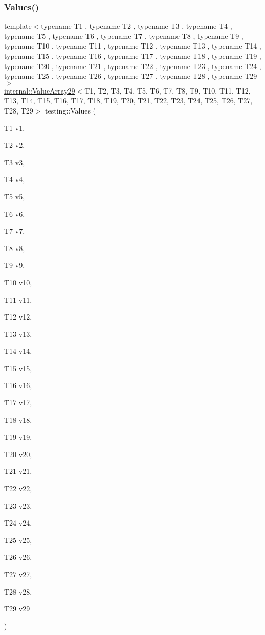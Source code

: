 \mbox{\label{namespacetesting_a3d8a9bd3f027d89ff2873e3f0ff396cb}} 
\subsubsection{\texorpdfstring{Values()}{Values()}\hspace{0.1cm}{\footnotesize\ttfamily [30/51]}}
{\footnotesize\ttfamily template$<$typename T1 , typename T2 , typename T3 , typename T4 , typename T5 , typename T6 , typename T7 , typename T8 , typename T9 , typename T10 , typename T11 , typename T12 , typename T13 , typename T14 , typename T15 , typename T16 , typename T17 , typename T18 , typename T19 , typename T20 , typename T21 , typename T22 , typename T23 , typename T24 , typename T25 , typename T26 , typename T27 , typename T28 , typename T29 $>$ \\
\mbox{\hyperlink{classtesting_1_1internal_1_1_value_array29}{internal\+::\+Value\+Array29}}$<$T1, T2, T3, T4, T5, T6, T7, T8, T9, T10, T11, T12, T13, T14, T15, T16, T17, T18, T19, T20, T21, T22, T23, T24, T25, T26, T27, T28, T29$>$ testing\+::\+Values (\begin{DoxyParamCaption}\item[{T1}]{v1,  }\item[{T2}]{v2,  }\item[{T3}]{v3,  }\item[{T4}]{v4,  }\item[{T5}]{v5,  }\item[{T6}]{v6,  }\item[{T7}]{v7,  }\item[{T8}]{v8,  }\item[{T9}]{v9,  }\item[{T10}]{v10,  }\item[{T11}]{v11,  }\item[{T12}]{v12,  }\item[{T13}]{v13,  }\item[{T14}]{v14,  }\item[{T15}]{v15,  }\item[{T16}]{v16,  }\item[{T17}]{v17,  }\item[{T18}]{v18,  }\item[{T19}]{v19,  }\item[{T20}]{v20,  }\item[{T21}]{v21,  }\item[{T22}]{v22,  }\item[{T23}]{v23,  }\item[{T24}]{v24,  }\item[{T25}]{v25,  }\item[{T26}]{v26,  }\item[{T27}]{v27,  }\item[{T28}]{v28,  }\item[{T29}]{v29 }\end{DoxyParamCaption})}

